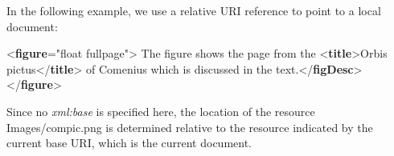 In the following example, we use a relative URI reference to point to a local document: \par\bgroup{}\exampleFont \begin{shaded}\noindent\mbox{}{<\textbf{figure}\hspace*{1em}{rend}="{float fullpage}">}\mbox{}\newline 
{}\mbox{}\newline 
{}The figure shows the page from the {<\textbf{title}>}Orbis\mbox{}\newline 
\hspace*{1em}\hspace*{1em}\hspace*{1em}\hspace*{1em} pictus{</\textbf{title}>} of Comenius which is discussed in the text.{</\textbf{figDesc}>}\mbox{}\newline 
{</\textbf{figure}>}\end{shaded}\egroup\par \noindent  Since no {\itshape xml:base} is specified here, the location of the resource \textsf{Images/compic.png} is determined relative to the resource indicated by the current base URI, which is the current document.\par
